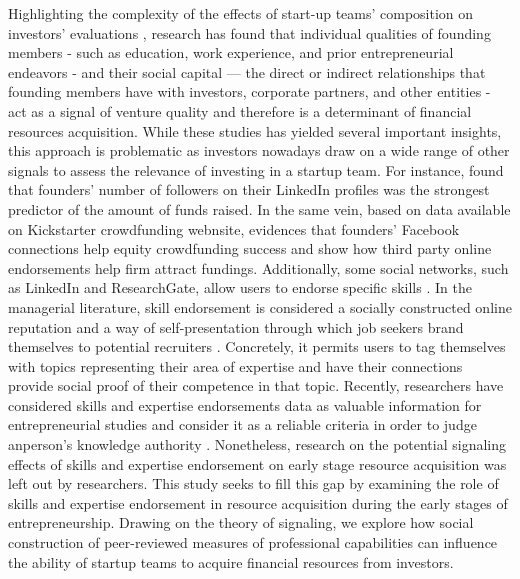 \documentclass[12pt]{article}
\begin{document}
Highlighting the complexity of the effects of start-up teams' composition on investors’ evaluations \citep{ghassemiautomated}, research has found that individual qualities of founding members - such as education, work experience, and prior entrepreneurial endeavors \citep{shane2002network, hsu2007experienced} - and their social capital — the direct or indirect relationships that founding members have with investors, corporate partners, and other entities \citep{shane2002network, hsu2007experienced, huang2017resources} - act as a signal of venture quality and therefore is a determinant of financial resources acquisition. While these studies has yielded several important insights, this approach is problematic as investors nowadays draw on a wide range of other signals to assess the relevance of investing in a startup team. For instance, \citet{banerji2019startup} found that founders' number of followers on their LinkedIn profiles was the strongest predictor of the amount of funds raised. In the same vein, based on data available on Kickstarter crowdfunding webnsite, \citet{mollick2014dynamics} evidences that founders' Facebook connections help equity crowdfunding success and \citet{courtney2017resolving} show how third party online endorsements help firm attract fundings. Additionally, some social networks, such as LinkedIn and ResearchGate, allow users to endorse specific skills \citep{perez2016endorsement, wu2018analysis}. In the managerial literature, skill endorsement is considered a socially constructed online reputation and a way of self-presentation through which job seekers brand themselves to potential recruiters \citep{rapanta2017linkedin}. Concretely, it permits users to tag themselves with topics representing their area of expertise and have their connections provide social proof of their competence in that topic. Recently, researchers have considered skills and expertise endorsements data as valuable information for entrepreneurial studies and consider it as a reliable criteria in order to judge anperson’s knowledge authority \citep{reese2020should, sako2020scaling}. Nonetheless, research on the potential signaling effects of skills and expertise endorsement on early stage resource acquisition was left out by researchers. This study seeks to fill this gap by examining the role of skills and expertise endorsement in resource acquisition during the early stages of entrepreneurship. Drawing on the theory of signaling, we explore how social construction of peer-reviewed measures of professional capabilities can influence the ability of startup teams to acquire financial resources from investors.
\end{document}
